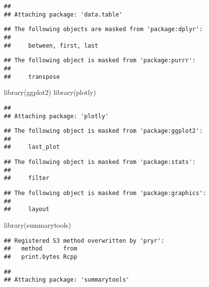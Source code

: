 \documentclass[
]{article}
\newenvironment{Shaded}{\begin{snugshade}}{\end{snugshade}}
\newcommand{\FunctionTok}[1]{\textcolor[rgb]{0.00,0.00,0.00}{#1}}
\newcommand{\NormalTok}[1]{#1}
\begin{document}
\begin{verbatim}
## 
## Attaching package: 'data.table'
\end{verbatim}

\begin{verbatim}
## The following objects are masked from 'package:dplyr':
## 
##     between, first, last
\end{verbatim}

\begin{verbatim}
## The following object is masked from 'package:purrr':
## 
##     transpose
\end{verbatim}

\begin{Shaded}
\begin{Highlighting}[]
\FunctionTok{library}\NormalTok{(ggplot2)}
\FunctionTok{library}\NormalTok{(plotly)}
\end{Highlighting}
\end{Shaded}

\begin{verbatim}
## 
## Attaching package: 'plotly'
\end{verbatim}

\begin{verbatim}
## The following object is masked from 'package:ggplot2':
## 
##     last_plot
\end{verbatim}

\begin{verbatim}
## The following object is masked from 'package:stats':
## 
##     filter
\end{verbatim}

\begin{verbatim}
## The following object is masked from 'package:graphics':
## 
##     layout
\end{verbatim}

\begin{Shaded}
\begin{Highlighting}[]
\FunctionTok{library}\NormalTok{(summarytools)}
\end{Highlighting}
\end{Shaded}

\begin{verbatim}
## Registered S3 method overwritten by 'pryr':
##   method      from
##   print.bytes Rcpp
\end{verbatim}

\begin{verbatim}
## 
## Attaching package: 'summarytools'
\end{verbatim}
\end{document}
